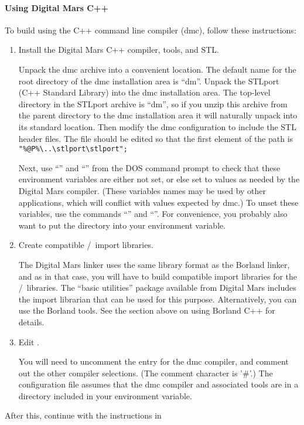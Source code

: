 \paragraph{Using Digital Mars C++}

To build using the  C++ 
command line compiler (dmc), follow these instructions:
\begin{enumerate}
\item Install the Digital Mars C++ compiler, tools, and STL.

  Unpack the dmc archive into a convenient location.  The default name
  for the root directory of the dmc installation area is ``dm''.  Unpack
  the STLport (C++ Standard Library) into the dmc installation area.
  The top-level directory in the STLport archive is ``dm'', so if you
  unzip this archive from the parent directory to the dmc installation
  area it will naturally unpack into its standard location.  Then modify
  the dmc configuration to include the STL header files.  The
   file should be edited so that the first
  element of the  path is \verb+"%@P%\..\stlport\stlport";+

  Next, use ``'' and ``'' from the DOS
  command prompt to check that these environment variables are either
  not set, or else set to values as needed by the Digital Mars compiler.
  (These variables names may be used by other applications, which will
  conflict with values expected by dmc.)  To unset these variables, use
  the commands ``'' and ``''.  For
  convenience, you probably also want to put the 
  directory into your environment  variable.

\item Create compatible \Tcl/\Tk\ import libraries.

  The Digital Mars linker uses the same library format as the Borland
  linker, and as in that case, you will have to build compatible
  import libraries for the \Tcl/\Tk\ libraries.  The ``basic
  utilities'' package available from Digital Mars includes the
   import librarian that can be used for this purpose.
  Alternatively, you can use the Borland tools.  See the section above
  on using Borland C++ for details.

\item Edit .

  You will need to uncomment the entry for the dmc compiler, and comment
  out the other compiler selections.  (The comment character is '\#'.)
  The configuration file assumes that the dmc compiler and associated
  tools are in a directory included in your environment 
  variable.

\end{enumerate}
After this, continue with the instructions in 
 

